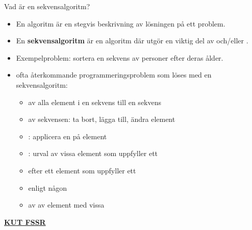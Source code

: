 


\begin{Slide}{Vad är en sekvensalgoritm?}\SlideFontTiny
\begin{itemize}
\item En algoritm är en stegvis beskrivning av lösningen på ett problem.
\item En \textbf{sekvensalgoritm} är en algoritm där  utgör en viktig del av  och/eller .
\item Exempelproblem: sortera en sekvens av personer efter deras ålder.
\pause
\item {} ofta återkommande programmeringsproblem som löses med en sekvensalgoritm:
\begin{itemize}\SlideFontTiny
\item {} av alla element i en sekvens till en  sekvens
\item {} av sekvensen: ta bort, lägga till, ändra  element
\item {}: applicera en  på  element   
\item {}: urval av vissa element som uppfyller ett 
\item {} efter ett element som uppfyller ett 
\item {} enligt någon 
\item {} av  av element med vissa 
\end{itemize}
\end{itemize}
\href{https://youtu.be/0ArlUSVDQIw?t=27s}{\textbf{KUT FSSR}} 
\end{Slide}

\ifkompendium\else
{
  \frame[plain]{\centering\Huge\textbf{\color{pink}{ORDNINGEN\\SPELAR\\ROLL}\\\color{red}{KUT FSSR}}}
}
\fi





